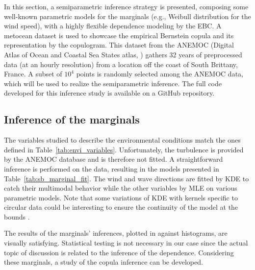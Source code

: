 In this section, a semiparametric inference strategy is presented, composing some well-known parametric models for the marginals (e.g., Weibull distribution for the wind speed), with a highly flexible dependence modeling by the EBC. 
A metocean dataset is used to showcase the empirical Bernstein copula and its representation by the copulogram. 
This dataset from the ANEMOC (Digital Atlas of Ocean and Coastal Sea States atlas, \citealp{raoult_2018_anemoc3}) gathers 32 years of preprocessed data 
(at an hourly resolution) from a location off the coast of South Brittany, France. 
A subset of $10^4$ points is randomly selected among the ANEMOC data, which will be used to realize the semiparametric inference.
The full code developed for this inference study is available on a GitHub repository\footnotemark. 


\subsection{Inference of the marginals}\label{sec:marginal_inference}

The variables studied to describe the environmental conditions match the ones defined in Table~\ref{tab:envi_variables}. 
Unfortunately, the turbulence is provided by the ANEMOC database and is therefore not fitted. 
A straightforward inference is performed on the data, resulting in the models presented in Table~\ref{tab:sb_marginal_fit}.
The wind and wave directions are fitted by KDE to catch their multimodal behavior while the other variables by MLE on various parametric models. 
Note that some variations of KDE with kernels specific to circular data could be interesting to ensure the continuity of the model at the bounds \citep{bai_1989_directional_kde}. 

The results of the marginals' inferences, plotted in  against histograms, are visually satisfying. 
Statistical testing is not necessary in our case since the actual topic of discussion is related to the inference of the dependence. 
Considering these marginals, a study of the copula inference can be developed. 


